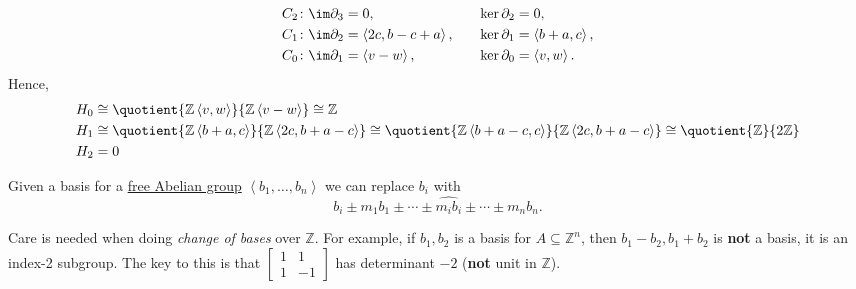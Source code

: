 \begin{explanation}
\[\begin{alignedat}{3}
			C_2&\colon \im \partial _3 = 0, &\ker \partial _2 &= 0, \\
			C_1&\colon \im \partial _2 = \left< 2c, b - c + a \right> , \qquad&\ker \partial _1 &= \left< b +a, c \right>,\\
			C_0&\colon \im \partial _1 = \left< v - w\right> , &\ker \partial _0 &= \left< v, w\right>.
		\end{alignedat}
	\]
	Hence,
	\[
		\begin{split}
			H_0 &\cong \quotient{\mathbb{Z} \left< v, w \right> }{\mathbb{Z} \left< v - w \right> } \cong \mathbb{Z}\\
			H_1 &\cong \quotient{\mathbb{Z} \left< b + a, c \right> }{\mathbb{Z} \left< 2c, b+a-c \right> } \cong \quotient{\mathbb{Z} \left< b + a - c, c \right> }{\mathbb{Z} \left< 2c, b+a-c \right> } \cong \quotient{\mathbb{Z} }{2\mathbb{Z}}\\
			H_2 &= 0\\
		\end{split}
	\]
\end{explanation}

\begin{remark}
	Given a basis for a \hyperref[def:free-Abelian-group]{free Abelian group} \(\left<  b_1, \ldots, b_n  \right>\) we can replace \(b_{i} \) with
	\[
		b_i \pm m_1b_1 \pm \cdots \pm \widehat{m_ib_i} \pm \cdots \pm m_n b_n.
	\]
\end{remark}

\begin{remark}
	Care is needed when doing \emph{change of bases} over \(\mathbb{Z} \). For example,
	if \(b_1, b_2\) is a basis for \(A \subseteq \mathbb{Z} ^n\), then \(b_1 - b_2, b_1 + b_2\) is \textbf{not} a basis, it is an index-2 subgroup.
	The key to this is that \(\begin{bmatrix} 1 & 1 \\ 1 & -1 \end{bmatrix}\) has determinant \(-2\) (\textbf{not} unit in \(\mathbb{Z}\)).
\end{remark}


